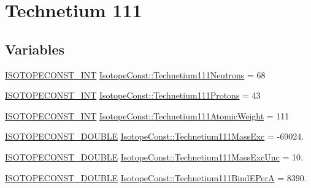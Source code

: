 \hypertarget{group___isotope_const-_technetium-_tc111}{}\section{Technetium 111}
\label{group___isotope_const-_technetium-_tc111}
\subsection*{Variables}
\begin{DoxyCompactItemize}
\item 
\mbox{\hyperlink{group___isotope_const-_macros_ga5f18360b3e99483a35c32d789e62621c}{I\+S\+O\+T\+O\+P\+E\+C\+O\+N\+S\+T\+\_\+\+I\+NT}} \mbox{\hyperlink{group___isotope_const-_technetium-_tc111_ga3d369d0ae19ccb4c6f620dae9b7b6989}{Isotope\+Const\+::\+Technetium111\+Neutrons}} = 68
\item 
\mbox{\hyperlink{group___isotope_const-_macros_ga5f18360b3e99483a35c32d789e62621c}{I\+S\+O\+T\+O\+P\+E\+C\+O\+N\+S\+T\+\_\+\+I\+NT}} \mbox{\hyperlink{group___isotope_const-_technetium-_tc111_ga7a9097968aa27e50d4ea9c1d2d697884}{Isotope\+Const\+::\+Technetium111\+Protons}} = 43
\item 
\mbox{\hyperlink{group___isotope_const-_macros_ga5f18360b3e99483a35c32d789e62621c}{I\+S\+O\+T\+O\+P\+E\+C\+O\+N\+S\+T\+\_\+\+I\+NT}} \mbox{\hyperlink{group___isotope_const-_technetium-_tc111_gadb44932c0d6378e364ed1a945be941c7}{Isotope\+Const\+::\+Technetium111\+Atomic\+Weight}} = 111
\item 
\mbox{\hyperlink{group___isotope_const-_macros_ga8f45a7272ce02c0b4c65c44636ed719a}{I\+S\+O\+T\+O\+P\+E\+C\+O\+N\+S\+T\+\_\+\+D\+O\+U\+B\+LE}} \mbox{\hyperlink{group___isotope_const-_technetium-_tc111_ga2883e8a958c993a7eb3a7460e6686c84}{Isotope\+Const\+::\+Technetium111\+Mass\+Exc}} = -\/69024.
\item 
\mbox{\hyperlink{group___isotope_const-_macros_ga8f45a7272ce02c0b4c65c44636ed719a}{I\+S\+O\+T\+O\+P\+E\+C\+O\+N\+S\+T\+\_\+\+D\+O\+U\+B\+LE}} \mbox{\hyperlink{group___isotope_const-_technetium-_tc111_ga4084738669642336740ffca0cb7b675c}{Isotope\+Const\+::\+Technetium111\+Mass\+Exc\+Unc}} = 10.
\item 
\mbox{\hyperlink{group___isotope_const-_macros_ga8f45a7272ce02c0b4c65c44636ed719a}{I\+S\+O\+T\+O\+P\+E\+C\+O\+N\+S\+T\+\_\+\+D\+O\+U\+B\+LE}} \mbox{\hyperlink{group___isotope_const-_technetium-_tc111_ga9b9850327df562053d065672c5c4f3b2}{Isotope\+Const\+::\+Technetium111\+Bind\+E\+PerA}} = 8390.

\end{DoxyCompactItemize}
